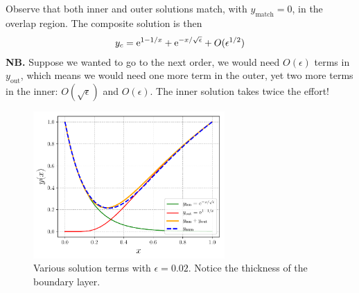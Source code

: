 Observe that both inner and outer solutions match, with $y_\text{match}=0$, in the overlap region. The composite solution is then
\begin{align*}
	y_c = \mathrm{e}^{1-1/x} + \mathrm{e}^{-x/\sqrt{\epsilon}} + O(\epsilon^{1/2})
\end{align*} 
{\bf NB.} Suppose we wanted to go to the next order, we would need $O(\epsilon)$ terms in $y_\text{out}$, which means we would need one more term in the outer, yet two more terms in the inner: $O(\sqrt{\epsilon})$ and $O(\epsilon)$. The inner solution takes twice the effort!
\begin{figure}[!h]
	\centering
	\includegraphics[width=0.65\textwidth]{./plots/pdf/strogatz-wk14.pdf}
	\caption{Various solution terms with $\epsilon=0.02$. Notice the thickness of the boundary layer.}
	\label{fig:strogatz-wk14}
\end{figure} \\








